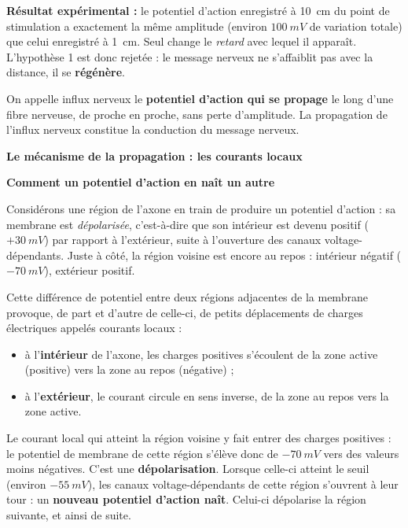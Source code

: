 \documentclass[11pt]{article}
\newcommand{\cle}[1]{{\popxbold\color{popdark}#1}}
\begin{document}
\textbf{Résultat expérimental :} le potentiel d'action enregistré à \SI{10}{cm} du point de stimulation a exactement la même amplitude (environ $\SI{100}{mV}$ de variation totale) que celui enregistré à \SI{1}{cm}. Seul change le \emph{retard} avec lequel il apparaît. L'hypothèse 1 est donc rejetée : le message nerveux ne s'affaiblit pas avec la distance, il se \textbf{régénère}.

\begin{definition}
On appelle \cle{influx nerveux} le \textbf{potentiel d'action qui se propage} le long d'une fibre nerveuse, de proche en proche, sans perte d'amplitude. La propagation de l'influx nerveux constitue la \cle{conduction} du message nerveux.
\end{definition}

\textbf{Le mécanisme de la propagation : les courants locaux}\par

\textbf{Comment un potentiel d'action en naît un autre}\par

Considérons une région de l'axone en train de produire un potentiel d'action : sa membrane est \emph{dépolarisée}, c'est-à-dire que son intérieur est devenu positif ($+\SI{30}{mV}$) par rapport à l'extérieur, suite à l'ouverture des canaux  voltage-dépendants. Juste à côté, la région voisine est encore au repos : intérieur négatif ($-\SI{70}{mV}$), extérieur positif.

Cette différence de potentiel entre deux régions adjacentes de la membrane provoque, de part et d'autre de celle-ci, de petits déplacements de charges électriques appelés \cle{courants locaux} :
\begin{itemize}
\item à l'\textbf{intérieur} de l'axone, les charges positives s'écoulent de la zone active (positive) vers la zone au repos (négative) ;
\item à l'\textbf{extérieur}, le courant circule en sens inverse, de la zone au repos vers la zone active.
\end{itemize}

Le courant local qui atteint la région voisine y fait entrer des charges positives : le potentiel de membrane de cette région s'élève donc de $-\SI{70}{mV}$ vers des valeurs moins négatives. C'est une \textbf{dépolarisation}. Lorsque celle-ci atteint le \cle{seuil} (environ $-\SI{55}{mV}$), les canaux  voltage-dépendants de cette région s'ouvrent à leur tour : un \textbf{nouveau potentiel d'action naît}. Celui-ci dépolarise la région suivante, et ainsi de suite.
\end{document}
